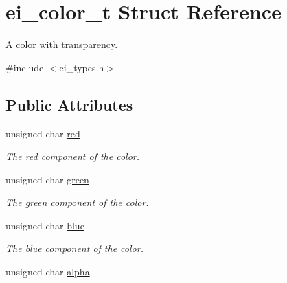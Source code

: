\hypertarget{structei__color__t}{}\section{ei\+\_\+color\+\_\+t Struct Reference}
\label{structei__color__t}


A color with transparency.  




{\ttfamily \#include $<$ei\+\_\+types.\+h$>$}

\subsection*{Public Attributes}
\begin{DoxyCompactItemize}
\item 
unsigned char \hyperlink{structei__color__t_a9adf283c79176b3426ac63784f0bc17b}{red}\hypertarget{structei__color__t_a9adf283c79176b3426ac63784f0bc17b}{}\label{structei__color__t_a9adf283c79176b3426ac63784f0bc17b}

\begin{DoxyCompactList}\small\item\em The red component of the color. \end{DoxyCompactList}\item 
unsigned char \hyperlink{structei__color__t_ad85ce262fb9c76fe3c52b4eed19505d1}{green}\hypertarget{structei__color__t_ad85ce262fb9c76fe3c52b4eed19505d1}{}\label{structei__color__t_ad85ce262fb9c76fe3c52b4eed19505d1}

\begin{DoxyCompactList}\small\item\em The green component of the color. \end{DoxyCompactList}\item 
unsigned char \hyperlink{structei__color__t_af8d67b7a72cbb586519b55033350fb8c}{blue}\hypertarget{structei__color__t_af8d67b7a72cbb586519b55033350fb8c}{}\label{structei__color__t_af8d67b7a72cbb586519b55033350fb8c}

\begin{DoxyCompactList}\small\item\em The blue component of the color. \end{DoxyCompactList}\item 
unsigned char \hyperlink{structei__color__t_af213a14356db920b1a04f5270263ae61}{alpha}
\end{DoxyCompactItemize}


